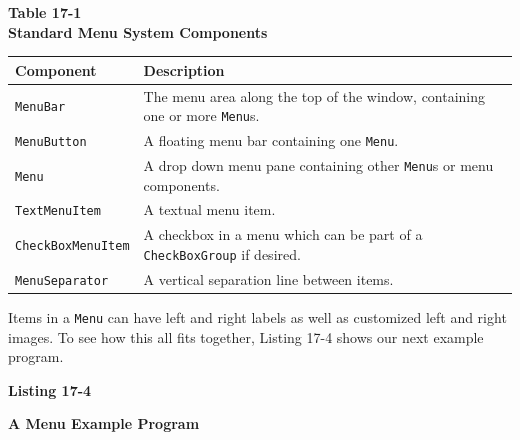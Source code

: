 \begin{center}
{\centering\sffamily\bfseries
Table 17-1 \\
Standard Menu System Components}
\end{center}
\begin{flushleft}
\begin{supertabular}{|m{1.6in}|m{4.3in}|}
\hline
\sffamily\bfseries Component &
\sffamily\bfseries Description\\\hline
\texttt{MenuBar} &
The menu area along the top of the window, containing one or
more \texttt{Menu}s.\\\hline
\texttt{MenuButton} &
A floating menu bar containing one \texttt{Menu}.\\\hline
\texttt{Menu} &
A drop down menu pane containing other \texttt{Menu}s or menu
components.\\\hline
\texttt{TextMenuItem} &
A textual menu item.\\\hline
\ttfamily \texttt{CheckBoxMenuItem}  &
A checkbox in a menu which can be part of a \texttt{CheckBoxGroup} if
desired.\\\hline
\texttt{MenuSeparator} &
A vertical separation line between items.\\\hline
\end{supertabular}
\end{flushleft}
Items in a \texttt{Menu} can have left and right labels as well as
customized left and right images. To see how this all fits together,
Listing 17-4 shows our next example program.

\bigskip

{\sffamily\bfseries
Listing 17-4}

{\sffamily\bfseries
A Menu Example Program}

